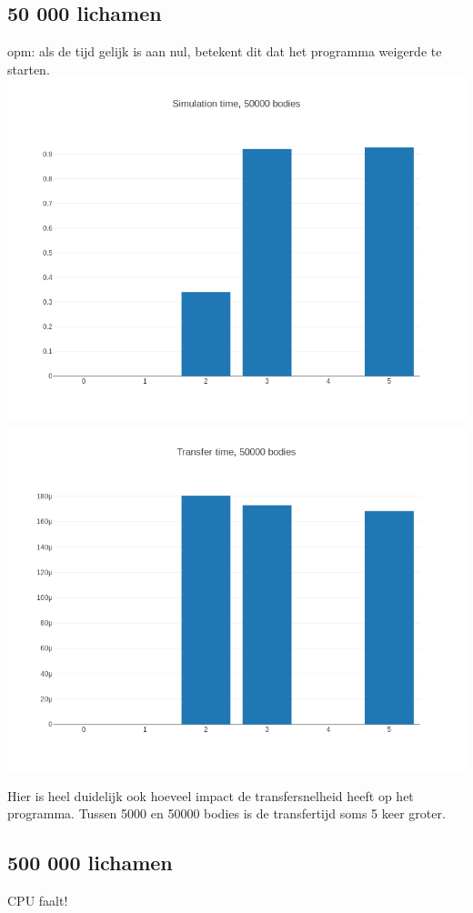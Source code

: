 \documentclass{article}
\begin{document}
\subsection{50 000 lichamen}
opm: als de tijd gelijk is aan nul, betekent dit dat het programma weigerde te starten.
\includegraphics[width=\linewidth]{grafiekskes/hist_simulation50000.png}
\includegraphics[width=\linewidth]{grafiekskes/hist_transfer50000.png}

Hier is heel duidelijk ook hoeveel impact de transfersnelheid heeft op het programma. 
Tussen 5000 en 50000 bodies is de transfertijd soms 5 keer groter.
\subsection{500 000 lichamen}
CPU faalt!
\end{document}
